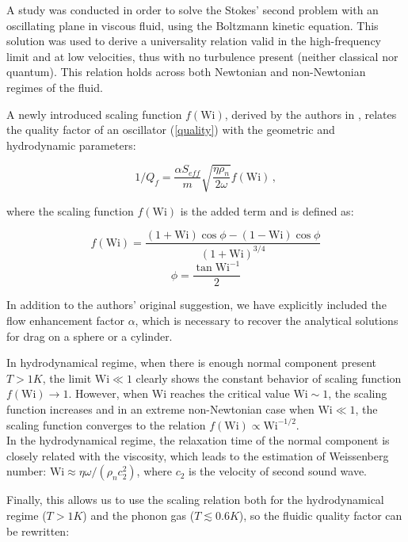 A study was conducted in order to solve the Stokes' second problem with an oscillating plane in viscous fluid, using the Boltzmann kinetic equation. This solution was used to derive a universality relation valid in the high-frequency limit and at low velocities, thus with no turbulence present (neither classical nor quantum). This relation holds across both Newtonian and non-Newtonian regimes of the fluid.

A newly introduced scaling function $f(\text{Wi})$, derived by the authors in \cite{universal_scaling}, relates the quality factor of an oscillator (\ref{quality}) with the geometric and hydrodynamic parameters:

\begin{equation}
1 / Q_f = \frac{\alpha S_{eff}}{m} \sqrt{\frac{\eta \rho_n}{2\omega}} f(\text{Wi})\,,
\label{scaling_function}
\end{equation}

where the scaling function $f(\text{Wi})$ is the added term and is defined as:

\begin{equation}
f(\text{Wi}) = \frac{(1 + \text{Wi}) \cos{\phi} - (1 - \text{Wi}) \cos{\phi}}{(1+\text{Wi})^{3/4}}
\label{f-Wi}
\end{equation}
\begin{equation}
\phi = \frac{\tan{\text{Wi}^{-1}}}{2}
\end{equation}

In addition to the authors' original suggestion, we have explicitly included the flow enhancement factor $\alpha$, which is necessary to recover the analytical solutions for drag on a sphere or a cylinder.

In hydrodynamical regime, when there is enough normal component present $T > 1\unit{K}$, the limit $\text{Wi} \ll 1$ clearly shows the constant behavior of scaling function $f(\text{Wi}) \rightarrow 1$. However, when Wi reaches the critical value $\text{Wi} \sim 1$, the scaling function increases and in an extreme non-Newtonian case when $\text{Wi} \ll 1$, the scaling function converges to the relation $f(\text{Wi}) \propto \text{Wi}^{-1/2}$.\\
In the hydrodynamical regime, the relaxation time of the normal component is closely related with the viscosity, which leads to the estimation of Weissenberg number: $\text{Wi} \approx \eta \omega / (\rho_n c_2^2)$, where $c_2$ is the velocity of second sound wave.

Finally, this allows us to use the scaling relation both for the hydrodynamical regime ($T > 1\unit{K}$) and the phonon gas ($T \lesssim 0.6\unit{K}$), so the fluidic quality factor can be rewritten:


